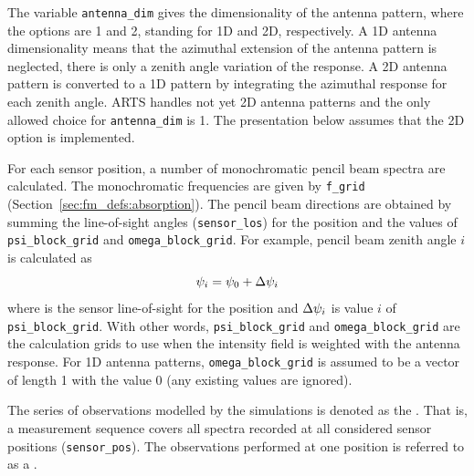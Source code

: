 The variable \verb|antenna_dim| gives the dimensionality of the
antenna pattern, where the
options are 1 and 2, standing for 1D and 2D, respectively. A 1D antenna
dimensionality means that the azimuthal extension of the antenna
pattern is neglected, there is only a zenith angle variation of the
response. A 2D antenna pattern is converted to a 1D pattern by
integrating the azimuthal response for each zenith angle. ARTS handles
not yet 2D antenna patterns and the only allowed choice for
\verb|antenna_dim| is 1. The presentation below assumes that the 2D
option is implemented.

For each sensor position, a number of monochromatic pencil beam
spectra are calculated. The monochromatic frequencies are given by
\verb|f_grid| (Section~\ref{sec:fm_defs:absorption}). The pencil beam
directions are obtained by summing the line-of-sight angles
(\verb|sensor_los|) for the position and the values of
\verb|psi_block_grid| and \verb|omega_block_grid|. For example, pencil
beam zenith angle $i$ is calculated as
\begin{equation}
  \psi_{i} = \psi_{0} + \Delta\psi_{i}
  \label{eq:fm_defs:psi_grid}
\end{equation}
where  is the sensor line-of-sight for the position and
$\Delta\psi_{i}$ is value $i$ of \verb|psi_block_grid|.  With other
words, \verb|psi_block_grid| and \verb|omega_block_grid| are the
calculation grids to use when the intensity field is weighted with the
antenna response. For 1D antenna patterns, \verb|omega_block_grid| is
assumed to be a vector of length 1 with the value 0 (any existing
values are ignored). 


\label{sec:fm_defs:seqsandblocks}

The series of observations modelled by the simulations is denoted as
the . That is, a measurement sequence covers all
spectra recorded at all considered sensor positions
(\verb|sensor_pos|). The observations performed at one position is
referred to as a . 

